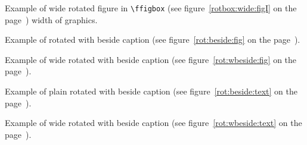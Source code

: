 \Text

\ifWideLayout
\clearpage
Example of wide rotated figure in \verb|\ffigbox| (see figure~\ref{rotbox:wide:figI} on the page~\pageref{rotbox:wide:figI})
width of graphics.

\begin{sidewaysfigure*}
\wideemptyfloatpage
{}
{\caption{Wide figure in \protect{} inside
\protect{} environment, width of graphics. \text. \text}%
\label{rotbox:wide:figI}}
\end{sidewaysfigure*}

\Text

\fi

\clearpage

Example of rotated  with beside caption
(see figure~\ref{rot:beside:fig} on the page~\pageref{rot:beside:fig}).

\begin{sidewaysfigure}
\emptyfloatpage
{}
{\caption{Rotated beside caption. \text}%
\label{rot:beside:fig}}
\end{sidewaysfigure}

\Text

\ifWideLayout
\clearpage
Example of wide rotated  with beside caption
(see figure~\ref{rot:wbeside:fig} on the page~\pageref{rot:wbeside:fig}).

\begin{sidewaysfigure*}
\wideemptyfloatpage
{}
{\caption{Wide rotated figure with beside caption. \text}%
\label{rot:wbeside:fig}}
\end{sidewaysfigure*}

\Text

\fi

\clearpage
Example of plain rotated  with beside caption
(see figure~\ref{rot:beside:text} on the page~\pageref{rot:beside:text}).

\begin{sidewaystextbox}
\emptyfloatpage
{\TEXTBOX[ \text.]}
{\caption{Beside caption. \text. \text. \text}%
\label{rot:beside:text}}
\end{sidewaystextbox}

\Text

\ifWideLayout

\clearpage
Example of wide rotated  with beside caption
(see figure~\ref{rot:wbeside:text} on the page~\pageref{rot:wbeside:text}).


